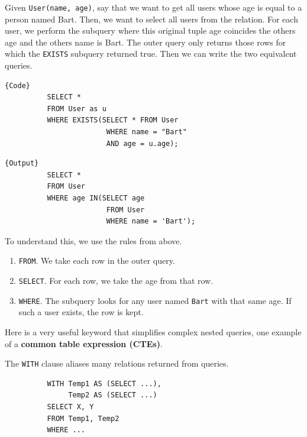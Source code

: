 \documentclass{article}
\begin{document}
      \begin{example}[Age]
        Given \texttt{User(name, age)}, say that we want to get all users whose age is equal to a person named Bart. Then, we want to select all users from the relation. For each user, we perform the subquery where this original tuple age coincides the others age and the others name is Bart. The outer query only returns those rows for which the \texttt{EXISTS} subquery returned true. Then we can write the two equivalent queries. 

        \noindent\begin{minipage}{.5\textwidth}
        \begin{lstlisting}[]{Code}
          SELECT * 
          FROM User as u
          WHERE EXISTS(SELECT * FROM User
                        WHERE name = "Bart" 
                        AND age = u.age); 
        \end{lstlisting}
        \end{minipage}
        \hfill
        \begin{minipage}{.49\textwidth}
        \begin{lstlisting}[]{Output}
          SELECT * 
          FROM User 
          WHERE age IN(SELECT age 
                        FROM User 
                        WHERE name = 'Bart'); 
        \end{lstlisting}
        \end{minipage}

        To understand this, we use the rules from above. 
        \begin{enumerate}
          \item \texttt{FROM}. We take each row in the outer query. 
          \item \texttt{SELECT}. For each row, we take the age from that row.  
          \item \texttt{WHERE}. The subquery looks for any user named \texttt{Bart} with that same age. If such a user exists, the row is kept. 
        \end{enumerate}
      \end{example}

      Here is a very useful keyword that simplifies complex nested queries, one example of a \textbf{common table expression (CTEs)}. 
      
      \begin{definition}
        The \texttt{WITH} clause aliases many relations returned from queries. 
        \begin{lstlisting}
          WITH Temp1 AS (SELECT ...), 
               Temp2 AS (SELECT ...) 
          SELECT X, Y 
          FROM Temp1, Temp2 
          WHERE ...
        \end{lstlisting}
      \end{definition}
\end{document}
